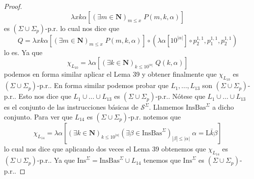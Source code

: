 \begin{lemma}
\begin{proof}
    \[
      \displaystyle \lambda xk\alpha \left[ (\exists m\in \mathbf{N})_{m\leq x}\;P(m,k,\alpha ) \right]
    \]
    es \((\Sigma \cup \Sigma _{p})\)-p.r. lo cual nos dice que
    \[
      \displaystyle Q=\lambda xk\alpha \left[ (\exists m\in \mathbf{N})_{m\leq x}\;P(m,k,\alpha ) \right] \circ
      (\lambda \alpha \left[ 10^{\left\vert \alpha \right\vert } \right] \circ p_{2}^{1,1},p_{1}^{1,1},p_{2}^{1,1})
    \]
    lo es. Ya que
    \[
      \displaystyle \chi _{L_{10}}=\lambda \alpha \left[ (\exists k\in \mathbf{N})_{k\leq 10^{\left\vert \alpha \right
      \vert }}\;Q(k,\alpha )\right]
    \]
    podemos en forma similar aplicar el Lema 39 y obtener finalmente que \(\chi _{L_{10}}\) es
    \((\Sigma \cup \Sigma _{p})\)-p.r..
    En forma similar podemos probar que \(L_{1},...,L_{13}\) son \((\Sigma \cup \Sigma _{p})\)-p.r..
    Esto nos dice que \(L_{1}\cup ...\cup L_{13}\) es \((\Sigma \cup \Sigma _{p})\)-p.r..
    Nótese que \(L_{1}\cup ...\cup L_{13}\) es el conjunto de las instrucciones básicas de \(\mathcal{S}^{\Sigma }\).
    Llamemos \( \mathrm{InsBas}^{\Sigma }\) a dicho conjunto.
    Para ver que \(L_{14}\) es \( (\Sigma \cup \Sigma _{p})\)-p.r. notemos que
    \[
      \displaystyle \chi _{L_{14}}=\lambda \alpha \left[ (\exists k\in \mathbf{N})_{k\leq 10^{\left\vert \alpha \right
      \vert }}(\exists \beta \in \mathrm{InsBas} ^{\Sigma })_{\left\vert \beta \right\vert \leq \left\vert \alpha \right
      \vert }\;\alpha =\mathrm{L}\bar{k}\beta \right]
    \]
    lo cual nos dice que aplicando dos veces el Lema 39 obtenemos que \(\chi _{L_{14}}\) es \((\Sigma \cup \Sigma _{p})
    \)-p.r.. Ya que \( \mathrm{Ins}^{\Sigma }=\mathrm{InsBas}^{\Sigma }\cup L_{14}\) tenemos que
    \( \mathrm{Ins}^{\Sigma }\) es \((\Sigma \cup \Sigma _{p})\)-p.r..
  \end{proof}
  \end{lemma}

